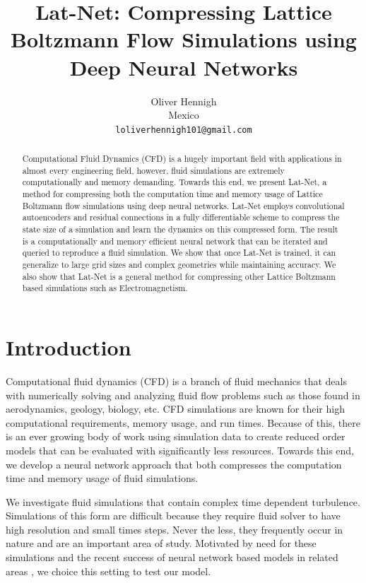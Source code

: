 \documentclass{article}
\title{Lat-Net: Compressing Lattice Boltzmann Flow Simulations using Deep Neural Networks}
\author{
  Oliver Hennigh \\
  Mexico \\
  \texttt{loliverhennigh101@gmail.com} \\
}
\begin{document}

\maketitle

\begin{abstract}
Computational Fluid Dynamics (CFD) is a hugely important field with applications in almost every engineering field, however, fluid simulations are extremely computationally and memory demanding. Towards this end, we present Lat-Net, a method for compressing both the computation time and memory usage of Lattice Boltzmann flow simulations using deep neural networks. Lat-Net employs convolutional autoencoders and residual connections in a fully differentiable scheme to compress the state size of a simulation and learn the dynamics on this compressed form. The result is a computationally and memory efficient neural network that can be iterated and queried to reproduce a fluid simulation. We show that once Lat-Net is trained, it can generalize to large grid sizes and complex geometries while maintaining accuracy. We also show that Lat-Net is a general method for compressing other Lattice Boltzmann based simulations such as Electromagnetism.

\end{abstract}

\section{Introduction}

Computational fluid dynamics (CFD) is a branch of fluid mechanics that deals with numerically solving and analyzing fluid flow problems such as those found in aerodynamics, geology, biology, etc. CFD simulations are known for their high computational requirements, memory usage, and run times. Because of this, there is an ever growing body of work using simulation data to create reduced order models that can be evaluated with significantly less resources. Towards this end, we develop a neural network approach that both compresses the computation time and memory usage of fluid simulations.

We investigate fluid simulations that contain complex time dependent turbulence. Simulations of this form are difficult because they require fluid solver to have high resolution and small times steps. Never the less, they frequently occur in nature and are an important area of study. Motivated by need for these simulations and the recent success of neural network based models in related areas \cite{tompson2016accelerating} \cite{guo2016convolutional} \cite{yang2016data}, we choice this setting to test our model.
\end{document}
